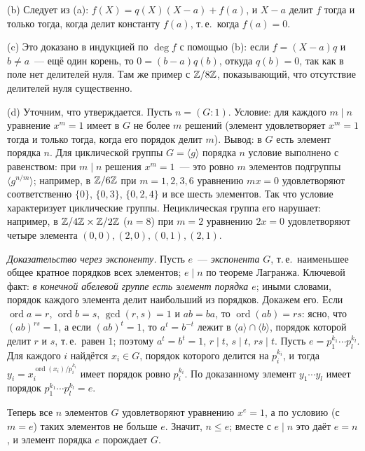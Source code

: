 (b) Следует из (a): $f(X)=q(X)(X-a)+f(a)$, и $X-a$ делит $f$ тогда и только тогда, когда делит константу $f(a)$, т.\,е.\
когда $f(a)=0$.

(c) Это доказано в  индукцией по $\deg f$ с помощью (b): если $f=(X-a)q$ и $b\ne a$~--- ещё один корень, то
$0=(b-a)q(b)$, откуда $q(b)=0$, так как в поле нет делителей нуля. Там же пример с $\mathbb Z/8\mathbb Z$, показывающий, что
отсутствие делителей нуля существенно.

(d) Уточним, что утверждается. Пусть $n=(G:1)$. Условие: для каждого $m\mid n$ уравнение $x^m=1$ имеет в $G$ не
более $m$ решений (элемент удовлетворяет $x^m=1$ тогда и только тогда, когда его порядок делит $m$). Вывод: в $G$ есть
элемент порядка $n$. Для циклической группы $G=\langle g\rangle$ порядка $n$ условие выполнено с равенством: при $m\mid n$
решения $x^m=1$~--- это ровно $m$ элементов подгруппы $\langle g^{n/m}\rangle$; например, в $\mathbb Z/6\mathbb Z$ при $m=1,2,3,6$
уравнению $mx=0$ удовлетворяют соответственно $\{0\}$, $\{0,3\}$, $\{0,2,4\}$ и все шесть элементов. Так что условие
характеризует циклические группы. Нециклическая группа его нарушает: например, в $\mathbb Z/4\mathbb Z\times\mathbb Z/2\mathbb Z$ ($n=8$) при $m=2$ уравнению $2x=0$
удовлетворяют четыре элемента $(0,0),(2,0),(0,1),(2,1)$.

\emph{Доказательство через экспоненту.} Пусть $e$~--- \emph{экспонента} $G$, т.\,е.\ наименьшее общее кратное порядков
всех элементов; $e\mid n$ по теореме Лагранжа. Ключевой факт: \emph{в конечной абелевой группе есть элемент порядка $e$};
иными словами, порядок каждого элемента делит наибольший из порядков. Докажем его. Если $\operatorname{ord} a=r$, $\operatorname{ord} b=s$,
$\gcd(r,s)=1$ и $ab=ba$, то $\operatorname{ord}(ab)=rs$: ясно, что $(ab)^{rs}=1$, а если $(ab)^t=1$, то $a^t=b^{-t}$ лежит в
$\langle a\rangle\cap\langle b\rangle$, порядок которой делит $r$ и $s$, т.\,е.\ равен $1$; поэтому $a^t=b^t=1$, $r\mid t$,
$s\mid t$, $rs\mid t$. Пусть $e=p_1^{k_1}\cdots p_l^{k_l}$. Для каждого $i$ найдётся $x_i\in G$, порядок которого делится
на $p_i^{k_i}$, и тогда $y_i=x_i^{\operatorname{ord}(x_i)/p_i^{k_i}}$ имеет порядок ровно $p_i^{k_i}$. По доказанному элемент
$y_1\cdots y_l$ имеет порядок $p_1^{k_1}\cdots p_l^{k_l}=e$.

Теперь все $n$ элементов $G$ удовлетворяют уравнению $x^e=1$, а по условию (с $m=e$) таких элементов не больше $e$.
Значит, $n\le e$; вместе с $e\mid n$ это даёт $e=n$, и элемент порядка $e$ порождает $G$.

